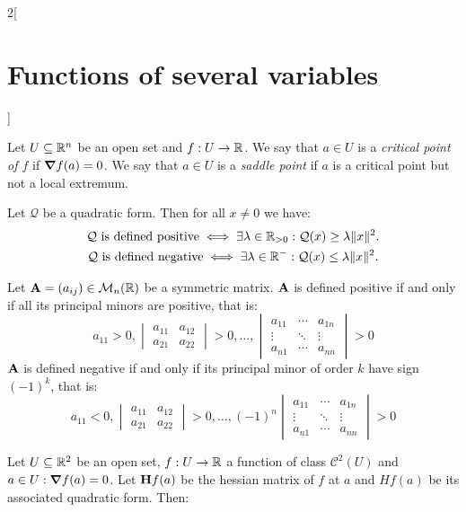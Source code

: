 \documentclass[../../../main.tex]{subfiles}
\begin{document}
\begin{multicols}{2}[\section{Functions of several variables}]
\begin{definition}
    Let $U\subseteq\mathbb{R}^n$ be an open set and $f:U\rightarrow\mathbb{R} $. We say that $a\in U$ is a \textit{critical point of $f$} if $\grad f(a)=0$. We say that $a\in U$ is a \textit{saddle point} if $a$ is a critical point but not a local extremum.
  \end{definition}
  \begin{theorem}
    Let $\mathcal{Q}$ be a quadratic form. Then for all $x\ne 0$ we have:
    \begin{gather*}
      \mathcal{Q}\text{ is defined positive}\iff\exists\lambda\in\mathbb{R}_{>0}:\mathcal{Q}(x)\geq\lambda\|x\|^2.\\
      \mathcal{Q}\text{ is defined negative}\iff\exists\lambda\in\mathbb{R}^-:\mathcal{Q}(x)\leq\lambda\|x\|^2.
    \end{gather*}
  \end{theorem}
  \begin{prop}
    Let $\vb{A}=(a_{ij})\in\mathcal{M}_n(\mathbb{R} )$ be a symmetric matrix. $\vb{A}$ is defined positive if and only if all its principal minors are positive, that is:
    $$a_{11}>0,
      \begin{vmatrix}
        a_{11} & a_{12} \\
        a_{21} & a_{22}\end{vmatrix}>0,\ldots,
      \begin{vmatrix}
        a_{11} & \cdots & a_{1n} \\
        \vdots & \ddots & \vdots \\
        a_{n1} & \cdots & a_{nn}
      \end{vmatrix}>0$$
    $\vb{A}$ is defined negative if and only if its principal minor of order $k$ have sign $(-1)^k$, that is:
    $$a_{11}<0,
      \begin{vmatrix}
        a_{11} & a_{12} \\
        a_{21} & a_{22}
      \end{vmatrix}>0,\ldots,
      (-1)^n\begin{vmatrix}
        a_{11} & \cdots & a_{1n} \\
        \vdots & \ddots & \vdots \\
        a_{n1} & \cdots & a_{nn}
      \end{vmatrix}>0$$
  \end{prop}
  \begin{theorem}
    Let $U\subseteq\mathbb{R}^2$ be an open set, $f:U\rightarrow\mathbb{R} $ a function of class $\mathcal{C}^2(U)$ and $a\in U:\grad f(a)=0$. Let $\vb{H}f(a)$ be the hessian matrix of $f$ at $a$ and $Hf(a)$ be its associated quadratic form. Then:

\end{theorem}
\end{multicols}
\end{document}
